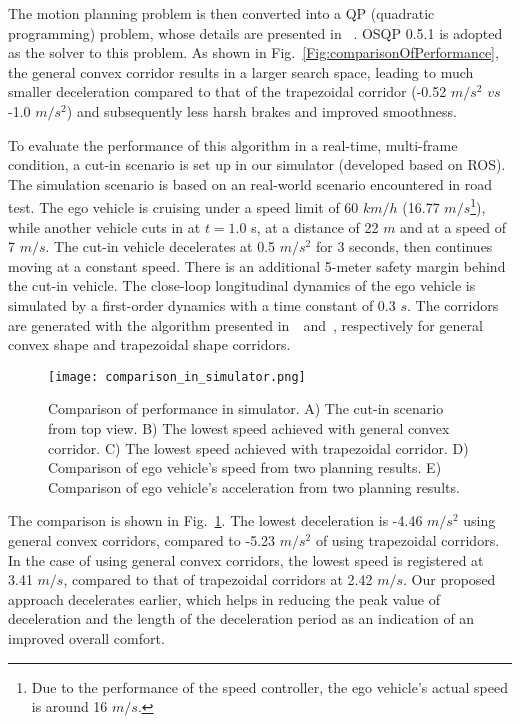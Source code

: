 The motion planning problem is then converted into a QP (quadratic programming) problem, whose details are presented in~\cite{ding2019safe} \cite{li2021speed}. OSQP 0.5.1 is adopted as the solver to this problem. As shown in Fig.~\ref{Fig:comparisonOfPerformance}, the general convex corridor results in a larger search space, leading to much smaller deceleration compared to that of the trapezoidal corridor (-0.52 $m/s^{2}$ $vs$ -1.0 $m/s^{2}$) and subsequently less harsh brakes and improved smoothness.

To evaluate the performance of this algorithm in a real-time, multi-frame condition, a cut-in scenario is set up in our simulator (developed based on ROS). The simulation scenario is based on an real-world scenario encountered in road test. The ego vehicle is cruising under a speed limit of 60 $km/h$ (16.77 $m/s$\footnote{Due to the performance of the speed controller, the ego vehicle's actual speed is around 16 $m/s$.}), while another vehicle cuts in at $t=1.0$ s, at a distance of 22 $m$ and at a speed of 7 $m/s$. The cut-in vehicle decelerates at 0.5 $m/s^2$ for 3 seconds, then continues moving at a constant speed. There is an additional 5-meter safety margin behind the cut-in vehicle. The close-loop longitudinal dynamics of the ego vehicle is simulated by a first-order dynamics with a time constant of 0.3 $s$. The corridors are generated with the algorithm presented in~\cite{xin2021enable}~and~\cite{li2021speed}, respectively for general convex shape and trapezoidal shape corridors.

\begin{figure}[tbp]
\begin{center}
\texttt{[image: comparison\_in\_simulator.png]}
\end{center}
\vspace{-0.2 in}
\caption{Comparison of performance in simulator. A) The cut-in scenario from top view. B) The lowest speed achieved with general convex corridor. C) The lowest speed achieved with trapezoidal corridor. D) Comparison of ego vehicle's speed from two planning results. E) Comparison of ego vehicle's acceleration from two planning results.}
\label{Fig:comparisonInSimulator}
\vspace{-0.2 in}
\end{figure}

The comparison is shown in Fig.~\ref{Fig:comparisonInSimulator}. The lowest deceleration is -4.46 $m/s^2$ using general convex corridors, compared to -5.23 $m/s^2$ of using trapezoidal corridors. In the case of using general convex corridors, the lowest speed is registered at 3.41 $m/s$, compared to that of trapezoidal corridors at 2.42 $m/s$. Our proposed approach decelerates earlier, which helps in reducing the peak value of deceleration and the length of the deceleration period as an indication of an improved overall comfort.